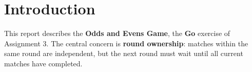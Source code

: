 \section{Introduction}

This report describes the \textbf{Odds and Evens Game}, the \textbf{Go} exercise of Assignment 3.
The central concern is \textbf{round ownership}: matches within the same round are independent, but the next round must wait
until all current matches have completed.
